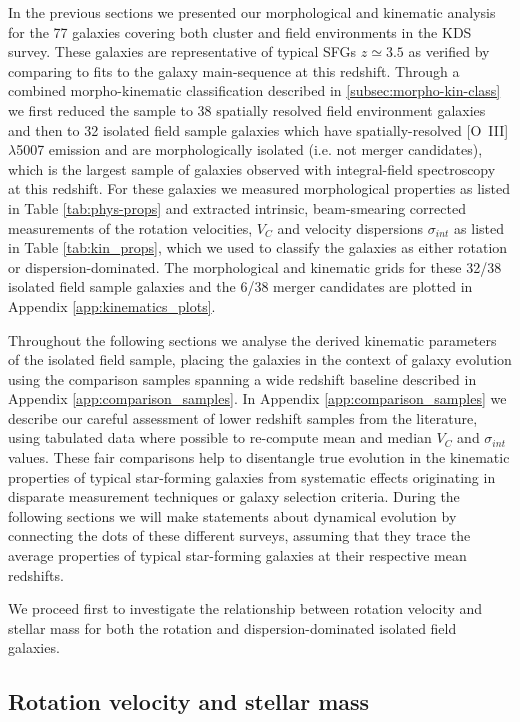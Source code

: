 \documentclass[fleqn,usenatbib]{mnras}
\begin{document}
In the previous sections we presented our morphological and kinematic analysis for the 77 galaxies covering both cluster and field environments in the KDS survey.
These galaxies are representative of typical SFGs $z\simeq3.5$ as verified by comparing to fits to the galaxy main-sequence at this redshift.
Through a combined morpho-kinematic classification described in \cref{subsec:morpho-kin-class} we first reduced the sample to 38 spatially resolved field environment galaxies and then to 32 isolated field sample galaxies which have spatially-resolved [O~{\sc III}]$\lambda$5007 emission and are morphologically isolated (i.e. not merger candidates), which is the largest sample of galaxies observed with integral-field spectroscopy at this redshift.
For these galaxies we measured morphological properties as listed in Table \ref{tab:phys-props} and extracted intrinsic, beam-smearing corrected measurements of the rotation velocities, $V_{C}$ and velocity dispersions $\sigma_{int}$ as listed in Table \ref{tab:kin_props}, which we used to classify the galaxies as either rotation or dispersion-dominated.
The morphological and kinematic grids for these 32/38 isolated field sample galaxies and the 6/38 merger candidates are plotted in Appendix \ref{app:kinematics_plots}.

Throughout the following sections we analyse the derived kinematic parameters of the isolated field sample, placing the galaxies in the context of galaxy evolution using the comparison samples spanning a wide redshift baseline described in Appendix \ref{app:comparison_samples}.
In Appendix \ref{app:comparison_samples} we describe our careful assessment of lower redshift samples from the literature, using tabulated data where possible to re-compute mean and median $V_{C}$ and $\sigma_{int}$ values.
These fair comparisons help to disentangle true evolution in the kinematic properties of typical star-forming galaxies from systematic effects originating in disparate measurement techniques or galaxy selection criteria.
During the following sections we will make statements about dynamical evolution by connecting the dots of these different surveys, assuming that they trace the average properties of typical star-forming galaxies at their respective mean redshifts.

We proceed first to investigate the relationship between rotation velocity and stellar mass for both the rotation and dispersion-dominated isolated field galaxies.

\subsection{Rotation velocity and stellar mass}\label{subsec:results_rotation_vel}
\end{document}
